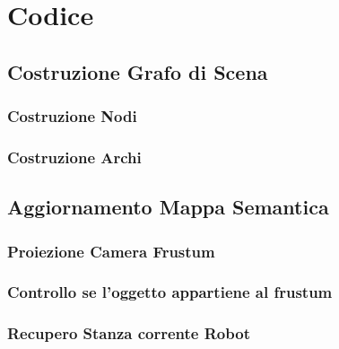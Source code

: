 \section{Codice}

\subsection{Costruzione Grafo di Scena}
\subsubsection{Costruzione Nodi}
\subsubsection{Costruzione Archi}

\subsection{Aggiornamento Mappa Semantica}
\subsubsection{Proiezione Camera Frustum}
\subsubsection{Controllo se l'oggetto appartiene al frustum}
\subsubsection{Recupero Stanza corrente Robot}
